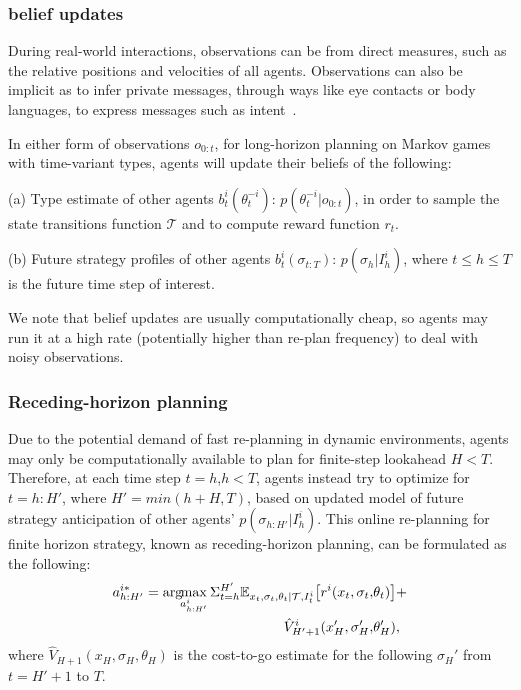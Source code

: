 \documentclass[letterpaper, 10 pt, conference]{ieeeconf}  %
\newcommand{\argmax}{\arg\!\!\max}
\begin{document}
\subsubsection{belief updates}\label{sec:belief_update}
During real-world interactions, observations can be from direct measures, such as the relative positions and velocities of all agents. Observations can also be implicit as to infer private messages, through ways like eye contacts or body languages, to express messages such as intent~\cite{knepper2017implicit}.

In either form of observations $o_{0:t}$, for long-horizon planning on Markov games with time-variant types, agents will update their beliefs of the following:

(a) Type estimate of other agents $b^i_t(\theta_t^{-i})$: 
$p(\theta^{-i}_t|o_{0:t})$, in order to sample the state transitions function $\mathcal{T}$ and to compute reward function $r_t$.

(b) Future strategy profiles of other agents $b^i_t(\sigma_{t:T})$: $p(\sigma_h|I^i_h)$, where $t\leq h\leq T$ is the future time step of interest.

We note that belief updates are usually computationally cheap, so agents may run it at a high 
rate (potentially higher than re-plan frequency) to deal with noisy 
observations.
 
\subsubsection{Receding-horizon planning}\label{sec:receding}
Due to the potential demand of fast re-planning in dynamic environments, agents may only be computationally available to plan for finite-step lookahead $H<T$. Therefore, at each time step $t=h$,$h<T$, agents instead try to optimize for $t=h:H'$, where $H'=min(h+H,T)$, based on updated model of future strategy 
anticipation of other agents' $p(\sigma_{h:H'}|I^i_h)$. This online re-planning 
for finite horizon strategy, known as receding-horizon planning, can be formulated as the following:
\begin{equation}
  \begin{aligned}
  a^{i*}_{h:H'} = \argmax_{a^i_{h:H'}} 
  \Sigma_{t=h}^{H'} 
  \mathbb{E}_{x_t,\sigma_{t},\theta_t|\mathcal{T},I^i_t} \big{[}
    r^i(x_t,\sigma_t,&\theta_t)\big{]}+ \\
    \hat{V}^i_{H'+1}(x_H',\sigma_H',&\theta_H'), 
  \end{aligned}
  \end{equation}
where $\hat{V}_{H+1}(x_H,\sigma_H,\theta_H)$ is the cost-to-go estimate for the following $\sigma_H'$ from $t=H'+1$ to $T$.
\end{document}

